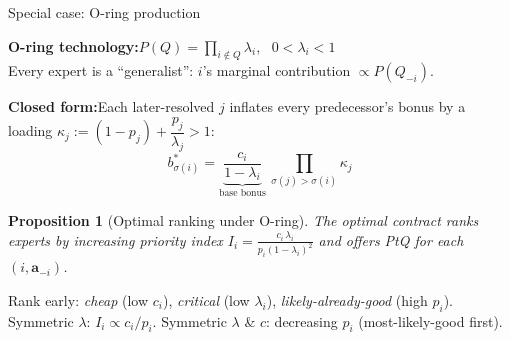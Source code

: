 \documentclass[10pt,aspectratio=169, compressed]{beamer}
\newtheorem{proposition}{Proposition}
\begin{document}
\begin{frame}[noframenumbering, label=oring]{Special case: O-ring production}

\textbf{O-ring technology:}\quad $P(Q) = \prod_{i\notin Q}\lambda_i$, \ $0<\lambda_i < 1$\\[0.2em]
Every expert is a ``generalist'': $i$'s marginal contribution $\propto P(Q_{-i})$.

\medskip

\textbf{Closed form:}\quad Each later-resolved $j$ inflates every predecessor's bonus by a loading $\kappa_j := (1-p_j) + \dfrac{p_j}{\lambda_j} > 1$:
$$b_{\sigma(i)}^* = \underbrace{\frac{c_i}{1-\lambda_i}}_{\text{base bonus}}\ \prod_{\sigma(j)>\sigma(i)}\kappa_j$$

\begin{proposition}[Optimal ranking under O-ring]
The optimal contract ranks experts by \emph{increasing} priority index
$\displaystyle I_i = \frac{c_i\,\lambda_i}{p_i(1-\lambda_i)^2}$ and offers PtQ for each $(i, \mathbf a_{-i})$.
\end{proposition}

\medskip

{\small Rank early: \emph{cheap} (low $c_i$), \emph{critical} (low $\lambda_i$), \emph{likely-already-good} (high $p_i$).\\
Symmetric $\lambda$: $I_i \propto c_i/p_i$. \quad Symmetric $\lambda$ \& $c$: decreasing $p_i$ (most-likely-good first).}
\hfill\hyperlink{proofsketchORING}{}
\end{frame}
\end{document}
